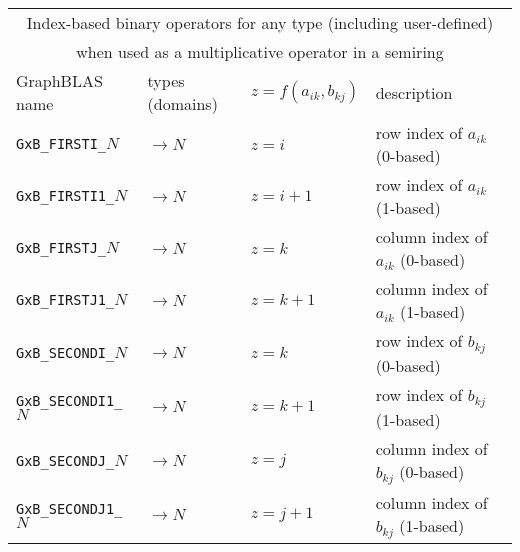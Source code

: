 \documentclass[12pt]{article}
\begin{document}
\vspace{0.2in}
{\footnotesize
\begin{tabular}{|llll|}
\hline
\multicolumn{4}{|c|}{Index-based binary operators for any type (including user-defined)} \\
\multicolumn{4}{|c|}{when used as a multiplicative operator in a semiring} \\
\hline
GraphBLAS name            & types (domains)   & $z=f(a_{ik},b_{kj})$      & description \\
\hline
\verb'GxB_FIRSTI_'$N$    & $ \rightarrow N$  & $z = i$       & row index of $a_{ik}$ (0-based) \\
\verb'GxB_FIRSTI1_'$N$   & $ \rightarrow N$  & $z = i+1$     & row index of $a_{ik}$ (1-based) \\
\verb'GxB_FIRSTJ_'$N$    & $ \rightarrow N$  & $z = k$       & column index of $a_{ik}$ (0-based) \\
\verb'GxB_FIRSTJ1_'$N$   & $ \rightarrow N$  & $z = k+1$     & column index of $a_{ik}$ (1-based) \\
\verb'GxB_SECONDI_'$N$   & $ \rightarrow N$  & $z = k$       & row index of $b_{kj}$ (0-based) \\
\verb'GxB_SECONDI1_'$N$  & $ \rightarrow N$  & $z = k+1$     & row index of $b_{kj}$ (1-based) \\
\verb'GxB_SECONDJ_'$N$   & $ \rightarrow N$  & $z = j$       & column index of $b_{kj}$ (0-based) \\
\verb'GxB_SECONDJ1_'$N$  & $ \rightarrow N$  & $z = j+1$     & column index of $b_{kj}$ (1-based) \\
\hline
\end{tabular}
}
\end{document}
